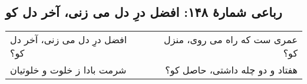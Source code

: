 \begin{center}
\section*{رباعی شمارهٔ ۱۴۸: افضل درِ دل می زنی، آخر دل کو}
\label{sec:148}
\begin{longtable}{l p{0.5cm} r}
افضل درِ دل می زنی، آخر دل کو؟
&&
عمری ست که راه می روی، منزل کو؟
\\
شرمت بادا ز خلوت و خلوتیان
&&
هفتاد و دو چله داشتی، حاصل کو؟
\\
\end{longtable}
\end{center}
